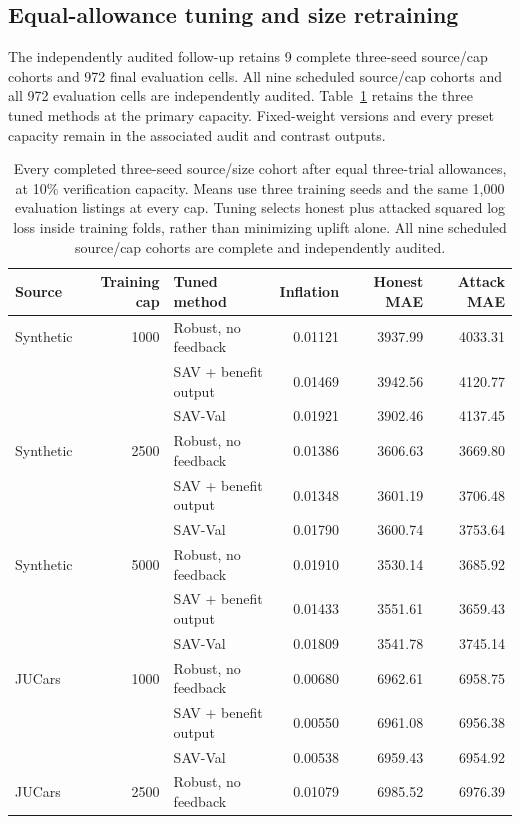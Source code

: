 \subsection{Equal-allowance tuning and size retraining}
The independently audited follow-up retains 9 complete three-seed source/cap cohorts and 972 final evaluation cells. All nine scheduled source/cap cohorts and all 972 evaluation cells are independently audited. Table~\ref{tab:equal_tuning_development} retains the three tuned methods at the primary capacity. Fixed-weight versions and every preset capacity remain in the associated audit and contrast outputs.

\begin{table}[t]
\centering
\caption{Every completed three-seed source/size cohort after equal three-trial allowances,
at 10\% verification capacity. Means use three training seeds and the same
1,000 evaluation listings at every cap. Tuning selects honest plus attacked
squared log loss inside training folds, rather than minimizing uplift alone.
All nine scheduled source/cap cohorts are complete and independently audited.}
\label{tab:equal_tuning_development}
\begin{tabular}{lrlrrr}
\toprule
Source & Training cap & Tuned method & Inflation & Honest MAE & Attack MAE\\
\midrule
Synthetic & 1000 & Robust, no feedback & 0.01121 & 3937.99 & 4033.31\\
 &  & SAV + benefit output & 0.01469 & 3942.56 & 4120.77\\
 &  & SAV-Val & 0.01921 & 3902.46 & 4137.45\\
\midrule
Synthetic & 2500 & Robust, no feedback & 0.01386 & 3606.63 & 3669.80\\
 &  & SAV + benefit output & 0.01348 & 3601.19 & 3706.48\\
 &  & SAV-Val & 0.01790 & 3600.74 & 3753.64\\
\midrule
Synthetic & 5000 & Robust, no feedback & 0.01910 & 3530.14 & 3685.92\\
 &  & SAV + benefit output & 0.01433 & 3551.61 & 3659.43\\
 &  & SAV-Val & 0.01809 & 3541.78 & 3745.14\\
\midrule
JUCars & 1000 & Robust, no feedback & 0.00680 & 6962.61 & 6958.75\\
 &  & SAV + benefit output & 0.00550 & 6961.08 & 6956.38\\
 &  & SAV-Val & 0.00538 & 6959.43 & 6954.92\\
\midrule
JUCars & 2500 & Robust, no feedback & 0.01079 & 6985.52 & 6976.39\\

\end{tabular}
\end{table}
